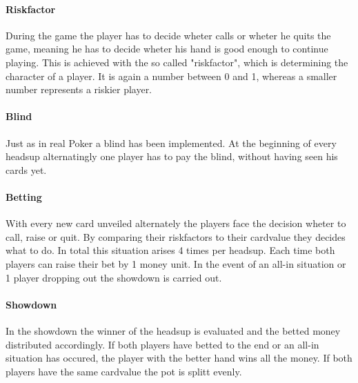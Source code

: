 \documentclass[11pt]{article}
\begin{document}
\paragraph{Riskfactor}
During the game the player has to decide wheter calls or wheter he quits the game, meaning he has to decide wheter his hand is good enough to continue playing. This is achieved with the so called "riskfactor", which is determining the character of a player. It is again a number between 0 and 1, whereas a smaller number represents a riskier player.

\paragraph{Blind}
Just as in real Poker a blind has been implemented. At the beginning of every headsup alternatingly one player has to pay the blind, without having seen his cards yet.

\paragraph{Betting}
With every new card unveiled alternately the players face the decision wheter to call, raise or quit. By comparing their riskfactors to their cardvalue they decides what to do. In total this situation arises 4 times per headsup. Each time both players can raise their bet by 1 money unit. In the event of an all-in situation or 1 player dropping out the showdown is carried out.

\paragraph{Showdown}
In the showdown the winner of the headsup is evaluated and the betted money distributed accordingly. If both players have betted to the end or an all-in situation has occured, the player with the better hand wins all the money. If both players have the same cardvalue the pot is splitt evenly.
\end{document}

